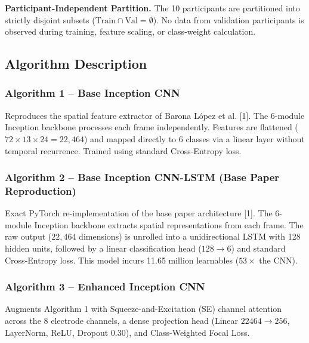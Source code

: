 \documentclass[conference]{IEEEtran}
\begin{document}
\textbf{Participant-Independent Partition.} The 10 participants are partitioned into strictly disjoint subsets ($\text{Train} \cap \text{Val} = \emptyset$). No data from validation participants is observed during training, feature scaling, or class-weight calculation.

\subsection{Algorithm Description}

\subsubsection{Algorithm 1 -- Base Inception CNN}
Reproduces the spatial feature extractor of Barona L{\'o}pez et al. [1]. The 6-module Inception backbone processes each frame independently. Features are flattened ($72 \times 13 \times 24 = 22,464$) and mapped directly to 6 classes via a linear layer without temporal recurrence. Trained using standard Cross-Entropy loss.

\subsubsection{Algorithm 2 -- Base Inception CNN-LSTM (Base Paper Reproduction)}
Exact PyTorch re-implementation of the base paper architecture [1]. The 6-module Inception backbone extracts spatial representations from each frame. The raw output ($22,464$ dimensions) is unrolled into a unidirectional LSTM with 128 hidden units, followed by a linear classification head ($128 \to 6$) and standard Cross-Entropy loss. This model incurs 11.65 million learnables ($53\times$ the CNN).

\subsubsection{Algorithm 3 -- Enhanced Inception CNN}
Augments Algorithm 1 with Squeeze-and-Excitation (SE) channel attention across the 8 electrode channels, a dense projection head (Linear $22464 \to 256$, LayerNorm, ReLU, Dropout 0.30), and Class-Weighted Focal Loss.
\end{document}

